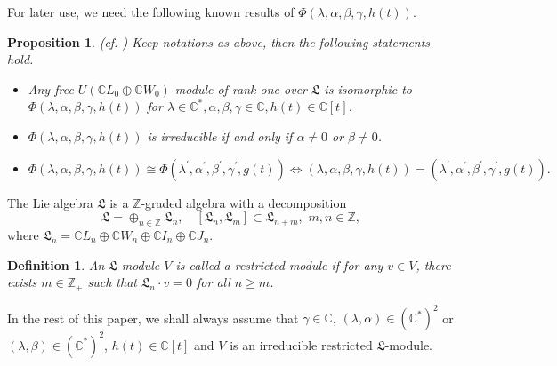\documentclass[12pt,leqno,amscd,amsfonts,amssymb]{amsart}
\def\a{\alpha}
\def\b{\beta}
\def\r{\gamma}
\def\Z{\mathbb{Z}}
\def\C{\mathbb{C}}
\numberwithin{equation}{section}
\newtheorem{defi}[theo]{Definition}
\newtheorem{prop}[theo]{Proposition}
\begin{document}
For later use, we need the following known results of $\Phi(\lambda,\a,\b,\r,h(t))$.
\begin{prop}\label{pop1}(cf. \cite{CG})
Keep notations as above, then the following statements hold.
\begin{itemize}
\item[(1)] Any free $U(\C L_0\oplus\C W_0)$-module of rank one over  $\mathfrak L$  is isomorphic to $\Phi(\lambda,\a,\b,\r,h(t))$ for $\lambda\in\C^*,\a,\b,\r\in\C, h(t)\in\C[t]$.
\item[(2)] $\Phi(\lambda,\a,\b,\r,h(t))$  is irreducible  if and only if $\a\neq0$ or $\b\neq0$.
\item[(3)] $\Phi(\lambda,\a,\b,\r,h(t))\cong \Phi(\lambda^{\prime},\a^{\prime},\b^{\prime},\r^\prime,g(t))\Longleftrightarrow (\lambda,\a,\b,\r,h(t))=(\lambda^{\prime},\a^{\prime},\b^{\prime},\r^\prime,g(t)).$
\end{itemize}
\end{prop}
The Lie algebra $\mathfrak L$ is a $\Z$-graded algebra with a decomposition
$$\mathfrak L=\oplus_{n\in\Z}\mathfrak L_{n},\quad [\mathfrak L_{n}, \mathfrak L_{m}]\subset\mathfrak L_{n+m},\,\,m,n\in\Z,$$
where  $\mathfrak L_{n}=\C L_n\oplus \C W_n\oplus \C I_n\oplus \C J_n$.
\begin{defi}\label{defi2.2}
An $\mathfrak L$-module $V$ is called a restricted module if for any $v \in V$, there exists $m \in \mathbb{Z}_{+}$ such that $\mathfrak L_n \cdot v = 0$ for all $n \geq m $. 
\end{defi}
    
In the rest of this paper, we shall always assume that $\r \in\C$, $(\lambda, \a)\in(\C^*)^2$ or $(\lambda, \b)\in(\C^*)^2$, $h(t) \in \mathbb{C}[t]$ and $V$ is an irreducible restricted $\mathfrak L$-module.
    
\end{document}
